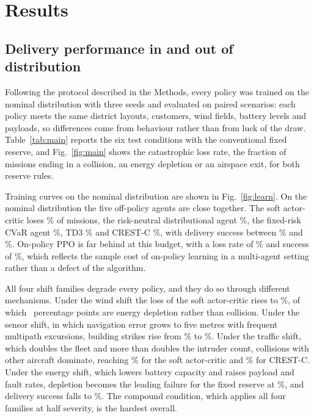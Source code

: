 \section*{Results}

\subsection*{Delivery performance in and out of distribution}

Following the protocol described in the Methods, every policy was trained on the nominal distribution with three seeds and evaluated on paired scenarios: each policy meets the same district layouts, customers, wind fields, battery levels and payloads, so differences come from behaviour rather than from luck of the draw. Table~\ref{tab:main} reports the six test conditions with the conventional fixed reserve, and Fig.~\ref{fig:main} shows the catastrophic loss rate, the fraction of missions ending in a collision, an energy depletion or an airspace exit, for both reserve rules.

Training curves on the nominal distribution are shown in Fig.~\ref{fig:learn}. On the nominal distribution the five off-policy agents are close together. The soft actor-critic loses \RSacStdLossNominal\% of missions, the risk-neutral distributional agent \RDsacnStdLossNominal\%, the fixed-risk CVaR agent \RDsaccvarStdLossNominal\%, TD3 \RTdthreeStdLossNominal\% and CREST-C \RCrestcStdLossNominal\%, with delivery success between \RTdthreeStdSuccNominal\% and \RDsacnStdSuccNominal\%. On-policy PPO is far behind at this budget, with a loss rate of \RPpoStdLossNominal\% and success of \RPpoStdSuccNominal\%, which reflects the sample cost of on-policy learning in a multi-agent setting rather than a defect of the algorithm.

All four shift families degrade every policy, and they do so through different mechanisms. Under the wind shift the loss of the soft actor-critic rises to \RSacStdLossWind\%, of which \RSacStdDepWind\ percentage points are energy depletion rather than collision. Under the sensor shift, in which navigation error grows to five metres with frequent multipath excursions, building strikes rise from \RSacStdCollbNominal\% to \RSacStdCollbSensor\%. Under the traffic shift, which doubles the fleet and more than doubles the intruder count, collisions with other aircraft dominate, reaching \RSacStdCollaTraffic\% for the soft actor-critic and \RCrestcStdCollaTraffic\% for CREST-C. Under the energy shift, which lowers battery capacity and raises payload and fault rates, depletion becomes the leading failure for the fixed reserve at \RSacStdDepEnergy\%, and delivery success falls to \RSacStdSuccEnergy\%. The compound condition, which applies all four families at half severity, is the hardest overall.

